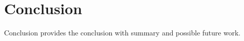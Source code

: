 \documentclass[conference]{IEEEtran}
\begin{document}

\section{Conclusion}
Conclusion provides the conclusion with summary and possible future work.






\newpage
\listoftodos
\end{document}

